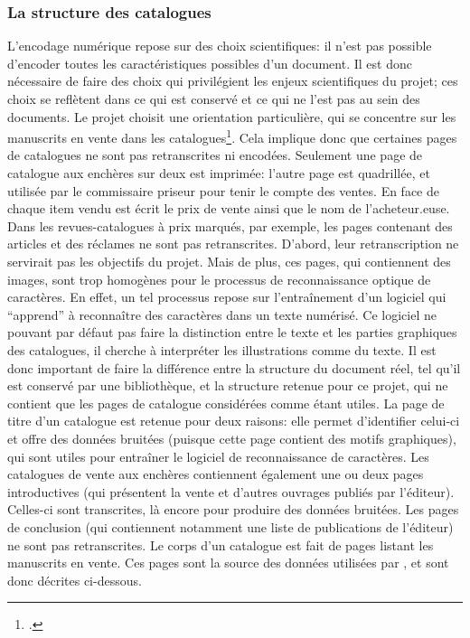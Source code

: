 \subsubsection{La structure des catalogues}
L'encodage numérique repose sur des choix scientifiques: il n'est pas possible d'encoder toutes les caractéristiques possibles d'un document. Il est donc nécessaire de faire des choix qui privilégient les enjeux scientifiques du projet; ces choix se reflètent dans ce qui est conservé et ce qui ne l'est pas au sein  des documents. Le projet \mssktb{} choisit une orientation particulière, qui se concentre sur les manuscrits en vente dans les catalogues\footcite[p. 27]{rondeau_du_noyer_encoder_2019}. Cela implique donc que certaines pages de catalogues ne sont pas retranscrites ni encodées. Seulement une page de catalogue aux enchères sur deux est imprimée: l'autre page est quadrillée, et utilisée par le commissaire priseur pour tenir le compte des ventes. En face de chaque item vendu est écrit le prix de vente ainsi que le nom de l'acheteur.euse. Dans les revues-catalogues à prix marqués, par exemple, les pages contenant des articles et des réclames ne sont pas retranscrites. D'abord, leur retranscription ne servirait pas les objectifs du projet. Mais de plus, ces pages, qui contiennent des images, sont trop homogènes pour le processus de reconnaissance optique de caractères. En effet, un tel processus repose sur l'entraînement d'un logiciel qui \enquote{apprend} à reconnaître des caractères dans un texte numérisé. Ce logiciel ne pouvant par défaut pas faire la distinction entre le texte et les parties graphiques des catalogues, il cherche à interpréter les illustrations comme du texte. Il est donc important de faire la différence entre la structure du document réel, tel qu'il est conservé par une bibliothèque, et la structure retenue pour ce projet, qui ne contient que les pages de catalogue considérées comme étant utiles. La page de titre d'un catalogue est retenue pour deux raisons: elle permet d'identifier celui-ci et offre des données bruitées (puisque cette page contient des motifs graphiques), qui sont utiles pour entraîner le logiciel de reconnaissance de caractères. Les catalogues de vente aux enchères contiennent également une ou deux pages introductives (qui présentent la vente et d'autres ouvrages publiés par l'éditeur). Celles-ci sont transcrites, là encore pour produire des données bruitées. Les pages de conclusion (qui contiennent notamment une liste de publications de l'éditeur) ne sont pas retranscrites. Le corps d'un catalogue est fait de pages listant les manuscrits en vente. Ces pages sont la source des données utilisées par \mssktb{}, et sont donc décrites ci-dessous.

